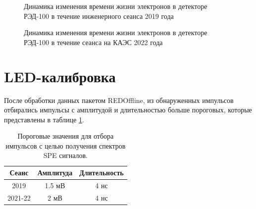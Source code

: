 \begin{figure}[H]	
	\caption{Динамика изменения времени жизни электронов в детекторе РЭД-100 в течение инженерного сеанса 2019 года}
	\label{img:lt2019}
\end{figure}

\begin{figure}[H]	
	\caption{Динамика изменения времени жизни электронов в детекторе РЭД-100 в течение сеанса на КАЭС 2022 года}
	\label{img:lt2022}
\end{figure}


\section{LED-калибровка}
\label{sect3_2}
После обработки данных пакетом REDOffline, из обнаруженных импульсов отбирались импульсы с амплитудой и длительностью больше пороговых, которые представлены в таблице \ref{tab:spethresholds}.
\begin{table}[hbt]
    \centering
        \caption{Пороговые значения для отбора импульсов с целью получения спектров SPE сигналов.}
\begin{tabular}{|c|c|c|}
\hline
    Сеанс & Амплитуда & Длительность\\
    \hline
    2019 & 1.5 мВ & 4 нс\\
    \hline
    2021-22 & 2 мВ & 4 нс\\
    \hline
\end{tabular}
    \label{tab:spethresholds}
\end{table}

